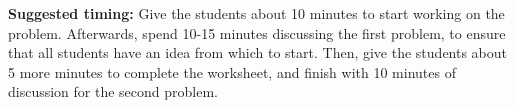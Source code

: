 \documentclass[nooutcomes,noauthor]{ximera}
\begin{document}
\begin{instructorNotes}
{\bf Suggested timing: } Give the students about 10 minutes to start working on the problem.  Afterwards, spend 10-15 minutes discussing the first problem, to ensure that all students have an idea from which to start.  Then, give the students about 5 more minutes to complete the worksheet, and finish with 10 minutes of discussion for the second problem.

\end{instructorNotes}
\end{document}
